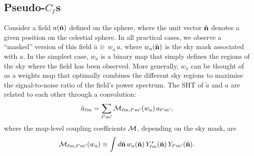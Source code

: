 \documentclass[%
 reprint,
superscriptaddress,
nofootinbib,
 amsmath,amssymb,
 aps,
 prd,
]{revtex4-2}
\newcommand{\nv}{\hat{\bf n}}
\begin{document}
  \subsection{Pseudo-\texorpdfstring{$C_\ell$}{CL}s}\label{ssec:pcls.pcl}
    Consider a field $a(\nv)$ defined on the sphere, where the unit vector $\nv$ denotes a given position on the celestial sphere. In all practical cases, we observe a ``masked'' version of this field $\tilde{a}\equiv\,w_a\,a$, where $w_a(\nv)$ is the sky mask associated with $a$. In the simplest case, $w_a$ is a binary map that simply defines the regions of the sky where the field has been observed. More generally, $w_a$ can be thought of as a weights map that optimally combines the different sky regions to maximise the signal-to-noise ratio of the field's power spectrum. The SHT of $\tilde{a}$ and $a$ are related to each other through a convolution:
    \begin{equation}\label{eq:mask_harmonic}
      \tilde{a}_{\ell m}=\sum_{\ell'm'}{\cal M}_{\ell m,\ell'm'}(w_a)\,a_{\ell'm'},
    \end{equation}
    where the map-level coupling coefficients ${\cal M}$, depending on the sky mask, are
    \begin{equation}\label{eq:map_mcm}
      {\cal M}_{\ell m,\ell'm'}(w_a)\equiv\int d\nv\,w_a(\nv)\,Y^*_{\ell m}(\nv)\,Y_{\ell'm'}(\nv).
    \end{equation}
\end{document}
